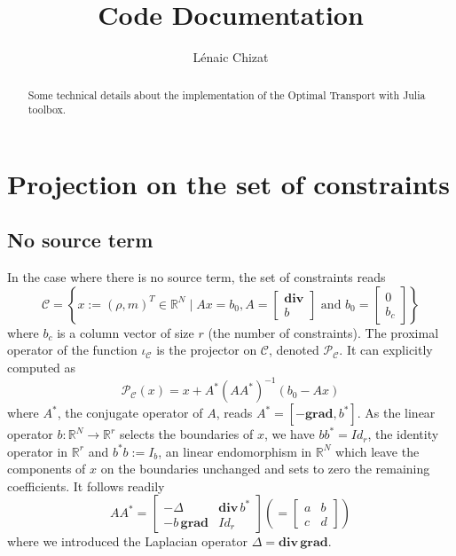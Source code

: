 \documentclass[13pt,aps,prb,preprint]{article}
\renewcommand{\div}{\mathbf{div}}
\newcommand{\grad}{\mathbf{grad}}
\newcommand{\R}{\mathbb{R}}
\begin{document}
\title{Code Documentation
\\
}
\author{L\'enaic Chizat}
\maketitle
\begin{abstract}
Some technical details about the implementation of the Optimal Transport with Julia toolbox.
\end{abstract}

\section{Projection on the set of constraints}
\subsection{No source term}

In the case where there is no source term, the set of constraints reads
\begin{equation}
\mathcal{C} = \left\{   x := (\rho,m)^T \in \R^N \mid  Ax = b_0 , A = \left[
\begin{array}{c}
\div  \\ \hline
b
\end{array}
\right]  \text{  and } b_0 = \left[
\begin{array}{c}
0  \\ \hline
b_c
\end{array}
\right]  \right\}
\end{equation}
where $b_c$ is a column vector of size $r$ (the number of constraints). The proximal operator of the function $\iota_\mathcal{C}$ is the projector on $\mathcal{C}$, denoted $\mathcal{P}_\mathcal{C}$. It can explicitly computed as
\begin{equation}
\mathcal{P}_\mathcal{C} (x) = x + A^* (A A^*)^{-1}(b_0 -Ax)
\end{equation}
where $A^*$, the conjugate operator of $A$, reads $A^* = [-\grad , b^*] $. As the linear operator $b : \R^N \rightarrow \R^r$ selects the boundaries of $x$, we have $bb^*=Id_r$, the identity operator in $\R^r$ and $b^*b:=I_b$, an linear endomorphism in $\R^N$ which leave the components of $x$ on the boundaries unchanged and sets to zero the remaining coefficients. It follows readily
\begin{equation}
AA^*= \left[
\begin{array}{c|c}
- \Delta & \div\, b^*\\ \hline
- b\, \grad & Id_r
\end{array} \right] \left( =
\left[
\begin{array}{c|c}
a& b\\ \hline
c & d
\end{array} \right]
\right)
\end{equation}
where we introduced the Laplacian operator $\Delta = \div \, \grad$.
\end{document}
